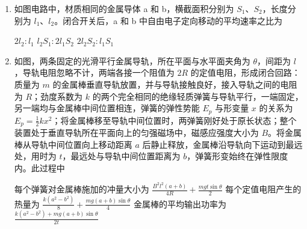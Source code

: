 \documentclass[\gkver]{gaokaozhenti}
\begin{document}
\begin{enumerate}
\item
如图电路中，材质相同的金属导体 a 和 b，横截面积分别为 $S_{1}$、$S_{2}$，长度分别为 $l_{1}$、$l_{2}$。闭合开关后，a 和 b 中自由电子定向移动的平均速率之比为


{$2l_{2}:l_{1}$}
{$l_{2}S_{1}:2l_{1}S_{2}$}
{$2l_{2}S_{2}:l_{1}S_{1}$}


\item
如图，两条固定的光滑平行金属导轨，所在平面与水平面夹角为 $\theta$，间距为 $l$，导轨电阻忽略不计，两端各接一个阻值为 $2R$ 的定值电阻，形成闭合回路：质量为 $m$ 的金属棒垂直导轨放置，并与导轨接触良好，接入导轨之间的电阻为 $R$；劲度系数为 $k$ 的两个完全相同的绝缘轻质弹簧与导轨平行，一端固定，另一端均与金属棒中间位置相连，弹簧的弹性势能 $E_{p}$ 与形变量 $x$ 的关系为 $E_{p} = \frac{1}{2}kx^{2}$；将金属棒移至导轨中间位置时，两弹簧刚好处于原长状态；整个装置处于垂直导轨所在平面向上的匀强磁场中，磁感应强度大小为 $B$。将金属棒从导轨中间位置向上移动距离 $a$ 后静止释放，金属棒沿导轨向下运动到最远处，用时为 $t$，最远处与导轨中间位置距离为 $b$，弹簧形变始终在弹性限度内。此过程中


{每个弹簧对金属棒施加的冲量大小为 $\frac{B^{2}l^{2}(a + b)}{4R} + \frac{mgt\sin\theta}{2}$}
{每个定值电阻产生的热量为 $\frac{k(a^{2} - b^{2})}{8} + \frac{mg(a + b)\sin\theta}{4}$}
{金属棒的平均输出功率为 $\frac{k(a^{2} - b^{2}) + mg(a + b)\sin\theta}{2t}$}


\end{enumerate}
\end{document}
